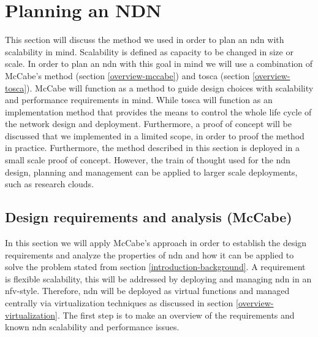 \section{Planning an NDN}
\label{planning-ndn}
This section will discuss the method we used in order to plan an \gls{ndn} with scalability in mind. Scalability is defined as capacity to be changed in size or scale. In order to plan an \gls{ndn} with this goal in mind we will use a combination of McCabe's method (section \ref{overview-mccabe}) and \gls{tosca} (section \ref{overview-tosca}). McCabe will function as a method to guide design choices with scalability and performance requirements in mind. While \gls{tosca} will function as an implementation method that provides the means to control the whole life cycle of the network design and deployment. Furthermore, a proof of concept will be discussed that we implemented in a limited scope, in order to proof the method in practice. Furthermore, the method described in this section is deployed in a small scale proof of concept. However, the train of thought used for the \gls{ndn} design, planning and management can be applied to larger scale deployments, such as research clouds.

\subsection{Design requirements and analysis (McCabe)}
\label{planning-requirements}
In this section we will apply McCabe's approach in order to establish the design requirements and analyze the properties of \gls{ndn} and how it can be applied to solve the problem stated from section \ref{introduction-background}. A requirement is flexible scalability, this will be addressed by deploying and managing \gls{ndn} in an \gls{nfv}-style. Therefore, \gls{ndn} will be deployed as virtual functions and managed centrally via virtualization techniques as discussed in section \ref{overview-virtualization}. The first step is to make an overview of the requirements and known \gls{ndn} scalability and performance issues.


